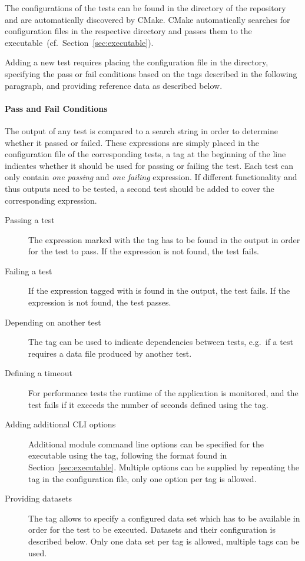 The configurations of the tests can be found in the  directory of the repository and are automatically discovered by CMake.
CMake automatically searches for \corry configuration files in the respective directory and passes them to the \corry executable~(cf.\ Section~\ref{sec:executable}).

Adding a new test requires placing the configuration file in the directory, specifying the pass or fail conditions based on the tags described in the following paragraph, and providing reference data as described below.

\paragraph{Pass and Fail Conditions}

The output of any test is compared to a search string in order to determine whether it passed or failed.
These expressions are simply placed in the configuration file of the corresponding tests, a tag at the beginning of the line indicates whether it should be used for passing or failing the test.
Each test can only contain \emph{one passing} and \emph{one failing} expression.
If different functionality and thus outputs need to be tested, a second test should be added to cover the corresponding expression.

\begin{description}
  \item[Passing a test] The expression marked with the tag  has to be found in the output in order for the test to pass. If the expression is not found, the test fails.
  \item[Failing a test] If the expression tagged with  is found in the output, the test fails. If the expression is not found, the test passes.
  \item[Depending on another test] The tag  can be used to indicate dependencies between tests, e.g.\ if a test requires a data file produced by another test.
  \item[Defining a timeout] For performance tests the runtime of the application is monitored, and the test fails if it exceeds the number of seconds defined using the  tag.
  \item[Adding additional CLI options] Additional module command line options can be specified for the  executable using the  tag, following the format found in Section~\ref{sec:executable}. Multiple options can be supplied by repeating the  tag in the configuration file, only one option per tag is allowed.
  \item[Providing datasets] The  tag allows to specify a configured data set which has to be available in order for the test to be executed. Datasets and their configuration is described below. Only one data set per tag is allowed, multiple tags can be used.
\end{description}

